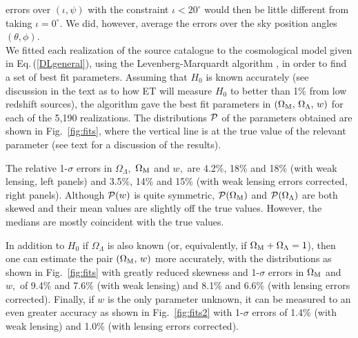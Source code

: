 {errors over $(\iota,\psi)$ with the constraint $\iota < 20^\circ$
would then be little different from taking $\iota = 0^\circ$. 
We did, however, average the errors over the sky position angles 
$(\theta,\phi)$.  
\\[5pt]
We fitted each realization of the source 
catalogue to the cosmological model given in Eq.\,(\ref{DLgeneral}), 
using the Levenberg-Marquardt algorithm \cite{Levenberg:1944,Marquardt:1963}, 
in order to find a set of best fit parameters.  
Assuming that $H_0$ is known accurately (see discussion in the text as to
how ET will measure $H_0$ to better than 1\% from low redshift sources), 
the algorithm gave the best fit parameters in $(\Omega_{\rm M},\,
\Omega_\Lambda,\, w)$ for each of the 5,190 realizations.
The distributions ${\cal P}$ of the parameters obtained
are shown in Fig.~\ref{fig:fits}, where the
vertical line is at the true value of the relevant parameter
(see text for a discussion of the results). 
}

The relative
1-$\sigma$ errors in $\Omega_{\Lambda},$  $\Omega_{\rm M}$ and $w,$
are 4.2\%, 18\% and 18\% (with weak lensing, left panels) and
3.5\%, 14\% and 15\% (with weak lensing errors corrected, right panels).
Although ${\cal P}(w)$ is quite symmetric,
${\cal P}(\Omega_{\rm M})$ and ${\cal P}(\Omega_\Lambda)$
are both skewed and their mean values are slightly off
the true values. However, the medians are mostly coincident with
the true values.

In addition to $H_0$ if $\Omega_{\Lambda}$ is also known (or, equivalently,
if $\Omega_{\rm M}+\Omega_{\Lambda}=1$), then one can estimate the
pair $(\Omega_{\rm M},\,w)$ more accurately, with the distributions
as shown in Fig.~\ref{fig:fits} with greatly reduced skewness
and 1-$\sigma$ errors in $\Omega_{\rm M}$ and $w,$ of 9.4\% and 7.6\%
(with weak lensing) and 8.1\% and 6.6\% (with lensing errors corrected).
Finally, if $w$ is the only parameter unknown, it can be measured to
an even greater accuracy as shown in Fig.~\ref{fig:fits2} with
1-$\sigma$ errors of 1.4\% (with weak lensing) and 1.0\% (with lensing
errors corrected).


